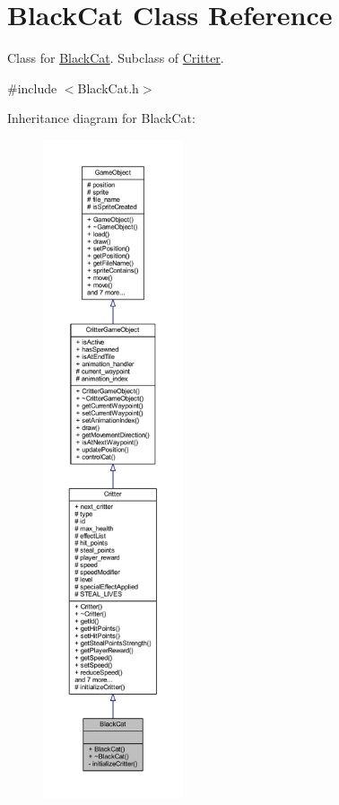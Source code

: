 \hypertarget{class_black_cat}{\section{Black\+Cat Class Reference}
\label{class_black_cat}
}


Class for \hyperlink{class_black_cat}{Black\+Cat}. Subclass of \hyperlink{class_critter}{Critter}.  




{\ttfamily \#include $<$Black\+Cat.\+h$>$}



Inheritance diagram for Black\+Cat\+:\nopagebreak
\begin{figure}[H]
\begin{center}
\leavevmode
\includegraphics[height=550pt]{class_black_cat__inherit__graph}
\end{center}
\end{figure}



